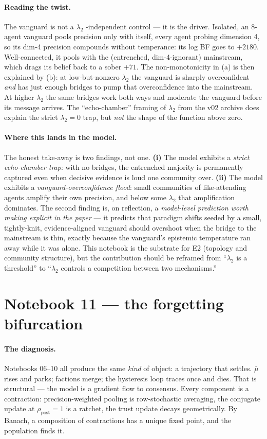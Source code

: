 \documentclass[11pt,a4paper]{article}
\theoremstyle{plain}
\begin{document}
\paragraph{Reading the twist.} The vanguard is not a $\lambda_2$%
-independent control --- it is the driver. Isolated, an 8-agent
vanguard pools precision only with itself, every agent probing
dimension 4, so its dim-4 precision compounds without temperance: its
log BF goes to $+2180$. Well-connected, it pools with the
(entrenched, dim-4-ignorant) mainstream, which drags its belief back to
a sober $+71$. The non-monotonicity in (a) is then explained by (b):
at low-but-nonzero $\lambda_2$ the vanguard is sharply overconfident
\emph{and} has just enough bridges to pump that overconfidence into the
mainstream. At higher $\lambda_2$ the same bridges work both ways and
moderate the vanguard before its message arrives. The
``echo-chamber'' framing of $\lambda_2$ from the v02 archive does
explain the strict $\lambda_2=0$ trap, but \emph{not} the shape of the
function above zero.

\paragraph{Where this lands in the model.} The honest take-away is two
findings, not one. \textbf{(i)} The model exhibits a \emph{strict
echo-chamber trap}: with no bridges, the entrenched majority is
permanently captured even when decisive evidence is loud one community
over. \textbf{(ii)} The model exhibits a \emph{vanguard-overconfidence
flood}: small communities of like-attending agents amplify their own
precision, and below some $\lambda_2$ that amplification dominates. The
second finding is, on reflection, a \emph{model-level prediction worth
making explicit in the paper} --- it predicts that paradigm shifts
seeded by a small, tightly-knit, evidence-aligned vanguard should
overshoot when the bridge to the mainstream is thin, exactly because
the vanguard's epistemic temperature ran away while it was alone. This
notebook is the substrate for E2 (topology and community structure),
but the contribution should be reframed from ``$\lambda_2$ is a
threshold'' to ``$\lambda_2$ controls a competition between two
mechanisms.''

\section{Notebook 11 --- the forgetting bifurcation}
\label{sec:nb11}

\paragraph{The diagnosis.} Notebooks 06--10 all produce the same
\emph{kind} of object: a trajectory that settles. $\bar\mu$ rises and
parks; factions merge; the hysteresis loop traces once and dies. That
is structural --- the model is a gradient flow to consensus. Every
component is a contraction: precision-weighted pooling is row-stochastic
averaging, the conjugate update at $\rho_{\text{post}}=1$ is a ratchet,
the trust update decays geometrically. By Banach, a composition of
contractions has a unique fixed point, and the population finds it.
\end{document}
